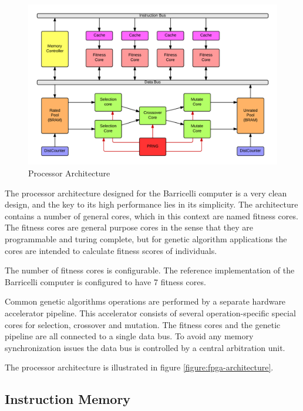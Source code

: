 \begin{figure}[H]
\includegraphics[width=\textwidth]{fpga/fig/processor_architecture.png}
\caption{Processor Architecture}
\label{figure:fpga-architecture}
\end{figure}


The processor architecture designed for the Barricelli computer is a very clean design, and the key to its high performance lies in its simplicity.
The architecture contains a number of general cores, which in this context are named fitness cores.
The fitness cores are general purpose cores in the sense that they are programmable and turing complete, but for genetic algorithm applications the cores are intended to calculate fitness scores of individuals.

The number of fitness cores is configurable.
The reference implementation of the Barricelli computer is configured to have 7 fitness cores.

Common genetic algorithms operations are performed by a separate hardware accelerator pipeline.
This accelerator consists of several operation-specific special cores for selection, crossover and mutation.
The fitness cores and the genetic pipeline are all connected to a single data bus.
To avoid any memory synchronization issues the data bus is controlled by a central arbitration unit.

The processor architecture is illustrated in figure \vref{figure:fpga-architecture}.


\subsection{Instruction Memory}
\label{subsec:fpga-instruction-memory}


